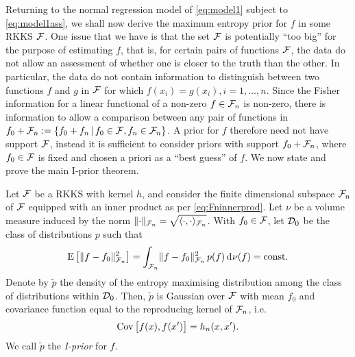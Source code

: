 Returning to the normal regression model of \cref{eq:model1} subject to \cref{eq:model1ass}, we shall now derive the maximum entropy prior for $f$ in some RKKS ${\mathcal F}$.
One issue that we have is that the set ${\mathcal F}$ is potentially ``too big'' for the purpose of estimating $f$, that is, for certain pairs of functions ${\mathcal F}$, the data do not allow an assessment of whether one is closer to the truth than the other.
In particular, the data do not contain information to distinguish between two functions $f$ and $g$ in ${\mathcal F}$ for which $f(x_i) = g(x_i), i=1,\dots,n$.
Since the Fisher information for a linear functional of a non-zero $f \in {\mathcal F}_n$ is non-zero, there is information to allow a comparison between any pair of functions in $f_0 + {\mathcal F}_n := \{f_0 + f_n \,|\, f_0 \in {\mathcal F}, f_n \in {\mathcal F}_n \}$.
A prior for $f$ therefore need not have support ${\mathcal F}$, instead it is sufficient to consider priors with support $f_0 + {\mathcal F}_n$, where $f_0 \in {\mathcal F}$ is fixed and chosen a priori as a ``best guess'' of $f$.
We now state and prove the main I-prior theorem.

\begin{theorem}
  Let ${\mathcal F}$ be a RKKS with kernel $h$, and consider the finite dimensional subspace ${\mathcal F}_n$ of ${\mathcal F}$ equipped with an inner product as per \cref{eq:Fninnerprod}.
  Let $\nu$ be a volume measure induced by the norm $\lVert\cdot\rVert_{{\mathcal F}_n} = \sqrt{\langle\cdot,\cdot\rangle_{{\mathcal F}_n}}$.
  With $f_0 \in {\mathcal F}$, let ${\mathcal D}_0$ be the class of distributions $p$ such that 
  \[
    \operatorname{E}\big[\lVert f-f_0\rVert^2_{{\mathcal F}_n}\big] = \int_{{\mathcal F}_n} \lVert f-f_0\rVert^2_{{\mathcal F}_n} \, p(f) \operatorname{d}\hspace{0.5pt}\! \nu(f) = \text{const.}\hspace{0.01em}
  \]
  Denote by $\tilde p$ the density of the entropy maximising distribution among the class of distributions within ${\mathcal D}_0$.
  Then, $\tilde p$ is Gaussian over ${\mathcal F}$ with mean $f_0$ and covariance function equal to the reproducing kernel of ${\mathcal F}_n$, i.e.
  \[
    \operatorname{Cov}\big[f(x),f(x')\big] = h_n(x,x').
  \]
  We call $\tilde p$ the \emph{I-prior} for $f$.
\end{theorem}

